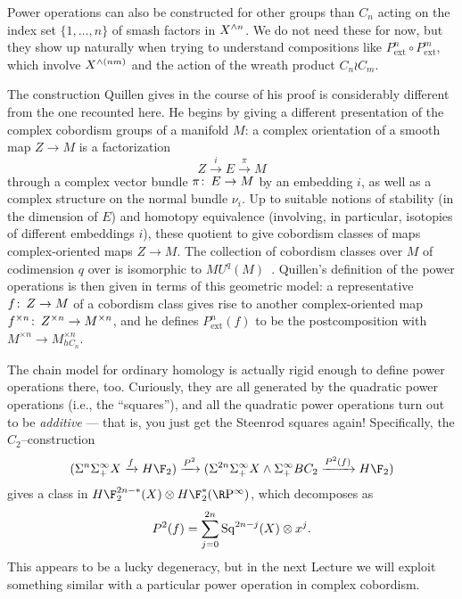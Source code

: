 \begin{remark}
Power operations can also be constructed for other groups than $C_n$ acting on the index set $\{1, \ldots, n\}$ of smash factors in $X^{\wedge n}$.  We do not need these for now, but they show up naturally when trying to understand compositions like $P^n_{\mathrm{ext}} \circ P^m_{\mathrm{ext}}$, which involve $X^{\wedge(nm)}$ and the action of the wreath product $C_n \wr C_m$.
\end{remark}

\begin{remark}
The construction Quillen gives in the course of his proof is considerably different from the one recounted here.  He begins by giving a different presentation of the complex cobordism groups of a manifold $M$: a complex orientation of a smooth map $Z \to M$ is a factorization \[Z \xrightarrow{i} E \xrightarrow{\pi} M\] through a complex vector bundle $\pi\colon\thinspace E \to M$ by an embedding $i$, as well as a complex structure on the normal bundle $\nu_i$.  Up to suitable notions of stability (in the dimension of $E$) and homotopy equivalence (involving, in particular, isotopies of different embeddings $i$), these quotient to give cobordism classes of maps complex-oriented maps $Z \to M$.  The collection of cobordism classes over $M$ of codimension $q$ over is isomorphic to $MU^q(M)$~\cite[Proposition 1.2]{Quillen}.  Quillen's definition of the power operations is then given in terms of this geometric model: a representative $f\colon\thinspace Z \to M$ of a cobordism class gives rise to another complex-oriented map $f^{\times n}\colon\thinspace Z^{\times n} \to M^{\times n}$, and he defines $P^n_{\mathrm{ext}}(f)$ to be the postcomposition with $M^{\times n} \to M^{\times n}_{hC_n}$.
\end{remark}

\begin{remark}
The chain model for ordinary homology is actually rigid enough to define power operations there, too.  Curiously, they are all generated by the quadratic power operations (i.e., the ``squares''), and all the quadratic power operations turn out to be \emph{additive} --- that is, you just get the Steenrod squares again!  Specifically, the $C_2$--construction \[(\Susp^n \Susp^\infty_+ X \xrightarrow{f} H\F_2) \xrightarrow{P^2} (\Susp^{2n} \Susp^\infty_+ X \sm \Susp^\infty_+ BC_2 \xrightarrow{P^2(f)} H\F_2)\] gives a class in $H\F_2^{2n-*}(X) \otimes H\F_2^*(\RP^\infty)$, which decomposes as \[P^2(f) = \sum_{j=0}^{2n} \operatorname{Sq}^{2n-j}(X) \otimes x^j.\]  This appears to be a lucky degeneracy, but in the next Lecture we will exploit something similar with a particular power operation in complex cobordism.
\end{remark}









